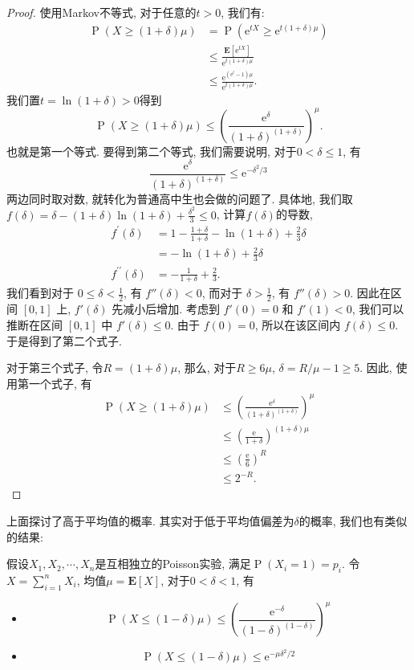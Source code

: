 \begin{proof}
    使用Markov不等式, 对于任意的$t>0$, 我们有: 
    $$
\begin{aligned}
\operatorname{P}(X \geq(1+\delta) \mu) & =\operatorname{P}\left(\mathrm{e}^{t X} \geq \mathrm{e}^{t(1+\delta) \mu}\right) \\
& \leq \frac{\mathbf{E}\left[\mathrm{e}^{t X}\right]}{\mathrm{e}^{t(1+\delta) \mu}} \\
& \leq \frac{\mathrm{e}^{\left(\mathrm{e}^t-1\right) \mu}}{\mathrm{e}^{t(1+\delta) \mu}} .
\end{aligned}
$$
我们置$t=\ln(1+\delta)>0$得到
$$
\operatorname{P}(X \geq(1+\delta) \mu) \leq\left(\frac{\mathrm{e}^\delta}{(1+\delta)^{(1+\delta)}}\right)^\mu.
$$
也就是第一个等式. 要得到第二个等式, 我们需要说明, 对于$0<\delta\leq 1$, 有
$$
\frac{\mathrm{e}^\delta}{(1+\delta)^{(1+\delta)}} \leq \mathrm{e}^{-\delta^2 / 3}
$$
两边同时取对数, 就转化为普通高中生也会做的问题了. 具体地, 我们取$f(\delta)=\delta-(1+\delta) \ln (1+\delta)+\frac{\delta^2}{3} \leq 0$, 计算$f(\delta)$的导数, 
$$
\begin{aligned}
f^{\prime}(\delta) & =1-\frac{1+\delta}{1+\delta}-\ln (1+\delta)+\frac{2}{3} \delta \\
& =-\ln (1+\delta)+\frac{2}{3} \delta \\
f^{\prime \prime}(\delta) & =-\frac{1}{1+\delta}+\frac{2}{3} .
\end{aligned}
$$
我们看到对于 $0 \leq \delta < \frac{1}{2}$, 有 $f''(\delta) < 0$, 而对于 $\delta > \frac{1}{2}$, 有 $f''(\delta) > 0$. 因此在区间 $[0, 1]$ 上, $f'(\delta)$ 先减小后增加. 
考虑到 $f'(0) = 0$ 和 $f'(1) < 0$, 我们可以推断在区间 $[0, 1]$ 中 $f'(\delta) \leq 0$. 由于 $f(0) = 0$, 所以在该区间内 $f(\delta) \leq 0$. 
于是得到了第二个式子. 

对于第三个式子, 令$R=(1+\delta) \mu$, 那么, 对于$R\geq 6\mu$, $\delta=R / \mu-1 \geq 5$. 因此, 使用第一个式子, 有$$\begin{aligned} \operatorname{P}(X \geq(1+\delta) \mu) & \leq\left(\frac{\mathrm{e}^\delta}{(1+\delta)^{(1+\delta)}}\right)^\mu \\ & \leq\left(\frac{\mathrm{e}}{1+\delta}\right)^{(1+\delta) \mu} \\ & \leq\left(\frac{\mathrm{e}}{6}\right)^R \\ & \leq 2^{-R} .\end{aligned}$$
\end{proof}

上面探讨了高于平均值的概率. 其实对于低于平均值偏差为$\delta$的概率, 我们也有类似的结果: 
\begin{theorem}
    假设$X_1, X_2, \cdots, X_n$是互相独立的Poisson实验, 满足$\operatorname{P}\left(X_i=1\right)=p_i$. 令$X=\sum_{i=1}^n X_i$, 均值$\mu=\mathbf{E}[X]$, 对于$0<\delta<1$, 有
    \begin{itemize}
        \item $$\operatorname{P}(X \leq(1-\delta) \mu) \leq\left(\frac{\mathrm{e}^{-\delta}}{(1-\delta)^{(1-\delta)}}\right)^\mu$$
        \item $$\operatorname{P}(X \leq(1-\delta) \mu) \leq \mathrm{e}^{-\mu \delta^2 / 2}$$
    \end{itemize}
\end{theorem}

